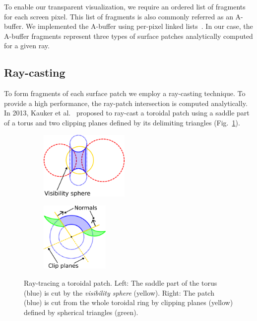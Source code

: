 \label{sec:vis}

To enable our transparent visualization, we require an ordered list of fragments for each screen pixel. This list of fragments is also commonly referred as an A-buffer. We implemented the A-buffer using per-pixel linked lists~\cite{yang2010real}. In our case, the A-buffer fragments represent three types of surface patches analytically computed for a given ray.

\subsection{Ray-casting}
\label{sec:spherical-patches}
To form fragments of each surface patch we employ a ray-casting technique. To provide a high performance, the ray-patch intersection is computed analytically.
In 2013, Kauker et al.~\cite{kauker2013rendering} proposed to ray-cast a toroidal patch using a saddle part of a torus and two clipping planes defined by its delimiting triangles (Fig.~\ref{fig:torus}).
\begin{figure}[htp]
  \centering
  \begin{subfigure}[t]{0.55\columnwidth}
    \centering
    \includegraphics[width=1.7in]{image/torus-vs.png}
  \end{subfigure}%
  \quad
  \begin{subfigure}[t]{0.4\columnwidth}
    \centering
    \includegraphics[width=1.3in]{image/torus-planes.png}
  \end{subfigure}
	\caption{Ray-tracing a toroidal patch. Left: The saddle part of the torus (blue) is cut by the \textit{visibility sphere} (yellow).
Right: The patch (blue) is cut from the whole toroidal ring by clipping planes (yellow) defined by spherical triangles (green).}
	\label{fig:torus}
\end{figure}


